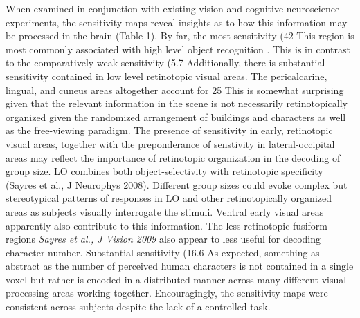 \documentclass[preprint,5p,authoryear]{elsarticle}
\begin{document}
When examined in conjunction with existing vision and cognitive neuroscience experiments, the sensitivity maps reveal insights as to how this information may be processed in the brain (Table 1).
By far, the most sensitivity (42%
This region is most commonly associated with high level object recognition \citep{lateraloccipital}.
This is in contrast to the comparatively weak sensitivity (5.7%
Additionally, there is substantial sensitivity contained in low level retinotopic visual areas. The pericalcarine, lingual, and cuneus areas altogether account for 25%
This is somewhat surprising given that the relevant information in the scene is not necessarily retinotopically organized given the randomized arrangement of buildings and characters as well as the free-viewing paradigm.
The presence of sensitivity in early, retinotopic visual areas, together with the preponderance of senstivity in lateral-occipital areas may reflect the importance of retinotopic organization in the decoding of group size. LO combines both object-selectivity with retinotopic specificity (Sayres et al., J Neurophys 2008). Different group sizes could evoke complex but stereotypical patterns of responses in LO and other retinotopically organized areas as subjects visually interrogate the stimuli. Ventral early visual areas apparently also contribute to this information. The less retinotopic fusiform regions \emph{Sayres et al., J Vision 2009} also appear to less useful for decoding character number.
Substantial sensitivity (16.6%
As expected, something as abstract as the number of perceived human characters is not contained in a single voxel but rather is encoded in a distributed manner across many different visual processing areas working together.
Encouragingly, the sensitivity maps were consistent across subjects despite the lack of a controlled task.
\end{document}
